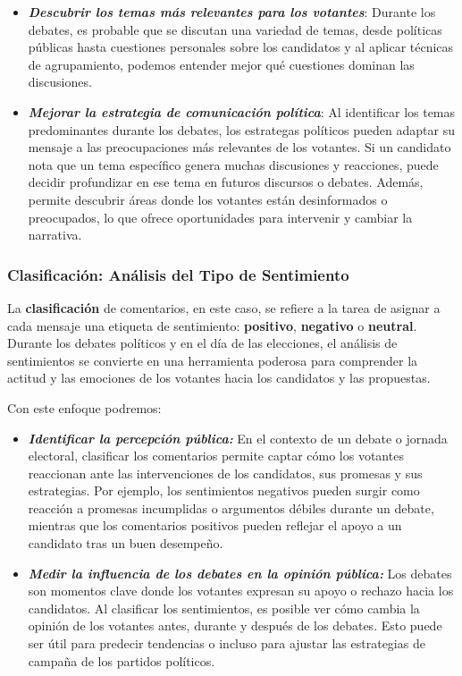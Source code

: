 \documentclass[10pt, a4paper]{article}
\begin{document}
	\begin{itemize}
		\item \textbf{\textit{Descubrir los temas más relevantes para los votantes}}: Durante los debates, es probable que se discutan una variedad de temas, desde políticas públicas hasta cuestiones personales sobre los candidatos y al aplicar técnicas de agrupamiento, podemos entender mejor qué cuestiones dominan las discusiones.
		\item \textbf{\textit{Mejorar la estrategia de comunicación política}}: Al identificar los temas predominantes durante los debates, los estrategas políticos pueden adaptar su mensaje a las preocupaciones más relevantes de los votantes. Si un candidato nota que un tema específico genera muchas discusiones y reacciones, puede decidir profundizar en ese tema en futuros discursos o debates. Además, permite descubrir áreas donde los votantes están desinformados o preocupados, lo que ofrece oportunidades para intervenir y cambiar la narrativa.
	\end{itemize}
	
	\subsubsection{Clasificación: Análisis del Tipo de Sentimiento}
	La \textbf{clasificación} de comentarios, en este caso, se refiere a la tarea de asignar a cada mensaje una etiqueta de sentimiento: \textbf{positivo}, \textbf{negativo} o \textbf{neutral}. Durante los debates políticos y en el día de las elecciones, el análisis de sentimientos se convierte en una herramienta poderosa para comprender la actitud y las emociones de los votantes hacia los candidatos y las propuestas.
	
	Con este enfoque podremos:
	\begin{itemize}
		\item \textbf{\textit{Identificar la percepción pública:}} En el contexto de un debate o jornada electoral, clasificar los comentarios permite captar cómo los votantes reaccionan ante las intervenciones de los candidatos, sus promesas y sus estrategias. Por ejemplo, los sentimientos negativos pueden surgir como reacción a promesas incumplidas o argumentos débiles durante un debate, mientras que los comentarios positivos pueden reflejar el apoyo a un candidato tras un buen desempeño.
		\item \textbf{\textit{Medir la influencia de los debates en la opinión pública:}} Los debates son momentos clave donde los votantes expresan su apoyo o rechazo hacia los candidatos. Al clasificar los sentimientos, es posible ver cómo cambia la opinión de los votantes antes, durante y después de los debates. Esto puede ser útil para predecir tendencias o incluso para ajustar las estrategias de campaña de los partidos políticos.
	\end{itemize}
	
\end{document}
